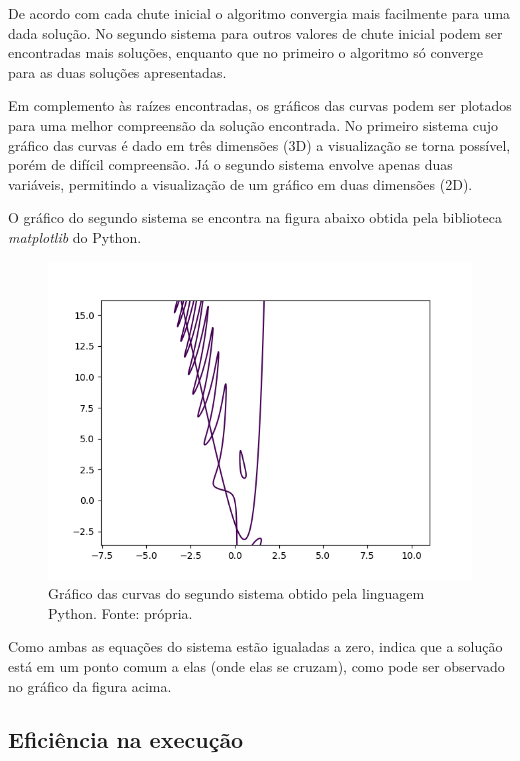 \documentclass[a4paper, 12pt, openright, oneside]{article}
\begin{document}
De acordo com cada chute inicial o algoritmo convergia mais facilmente para uma dada solução. No segundo sistema para outros valores de chute inicial podem ser encontradas mais soluções, enquanto que no primeiro o algoritmo só converge para as duas soluções apresentadas.

Em complemento às raízes encontradas, os gráficos das curvas podem ser plotados para uma melhor compreensão da solução encontrada. No primeiro sistema cujo gráfico das curvas é dado em três dimensões (3D) a visualização se torna possível, porém de difícil compreensão. Já o segundo sistema envolve apenas duas variáveis, permitindo a visualização de um gráfico em duas dimensões (2D).

O gráfico do segundo sistema se encontra na figura abaixo obtida pela biblioteca \textit{matplotlib} do Python.

\begin{figure}[!htb]
\centering
\includegraphics[scale=0.7]{Imagens/2d.png}
\caption{Gráfico das curvas do segundo sistema obtido pela linguagem Python. Fonte: própria.}
\label{galvanometro}
\end{figure}

Como ambas as equações do sistema estão igualadas a zero, indica que a solução está em um ponto comum a elas (onde elas se cruzam), como pode ser observado no gráfico da figura acima. 



\subsection{Eficiência na execução}
\end{document}
